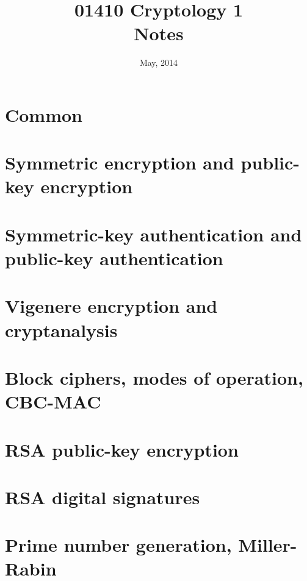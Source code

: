 \documentclass{article}
\title{
  01410 Cryptology 1\\
  Notes
}
\date{May, 2014}
\author{}
\begin{document}
\maketitle
\clearpage

\tableofcontents
\clearpage

\section{Common}

\clearpage

\section{Symmetric encryption and public-key encryption}

\clearpage

\section{Symmetric-key authentication and public-key authentication}

\clearpage

\section{Vigenere encryption and cryptanalysis}

\clearpage

\section{Block ciphers, modes of operation, CBC-MAC}

\clearpage

\section{RSA public-key encryption}

\clearpage

\section{RSA digital signatures}

\clearpage

\section{Prime number generation, Miller-Rabin}

\clearpage
\end{document}
